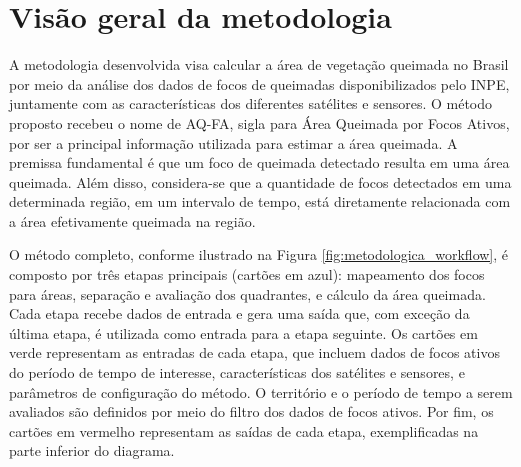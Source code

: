 \documentclass[cic,tc]{iiufrgs}
\begin{document}
\section{Visão geral da metodologia}

A metodologia desenvolvida visa calcular a área de vegetação queimada no Brasil por meio da análise dos dados de focos de queimadas disponibilizados pelo INPE, juntamente com as características dos diferentes satélites e sensores. O método proposto recebeu o nome de AQ-FA, sigla para Área Queimada por Focos Ativos, por ser a principal informação utilizada para estimar a área queimada. A premissa fundamental é que um foco de queimada detectado resulta em uma área queimada. Além disso, considera-se que a quantidade de focos detectados em uma determinada região, em um intervalo de tempo, está diretamente relacionada com a área efetivamente queimada na região.

O método completo, conforme ilustrado na Figura \ref{fig:metodologica_workflow}, é composto por três etapas principais (cartões em azul): mapeamento dos focos para áreas, separação e avaliação dos quadrantes, e cálculo da área queimada. Cada etapa recebe dados de entrada e gera uma saída que, com exceção da última etapa, é utilizada como entrada para a etapa seguinte. Os cartões em verde representam as entradas de cada etapa, que incluem dados de focos ativos do período de tempo de interesse, características dos satélites e sensores, e parâmetros de configuração do método. O território e o período de tempo a serem avaliados são definidos por meio do filtro dos dados de focos ativos. Por fim, os cartões em vermelho representam as saídas de cada etapa, exemplificadas na parte inferior do diagrama.
\end{document}
